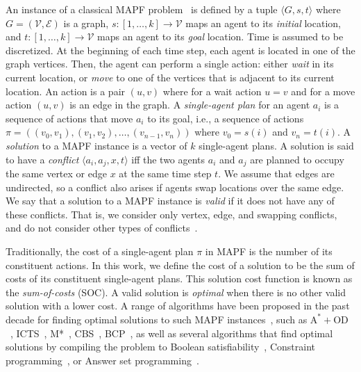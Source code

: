 \documentclass[jair,twoside,11pt,theapa]{article}
\newcommand{\tuple}[1]{\langle#1\rangle}
\newcommand{\vertices}{\mathcal{V}}
\newcommand{\edges}{\mathcal{E}}
\newcommand{\sourcetargets}{\mathcal{S}}
\newcommand{\oda}{$\mathrm{A^{*}+OD}$\xspace}
\begin{document}
An instance of a classical MAPF problem~ is defined by a tuple $\tuple{G, s, t}$ where $G=(\vertices,\edges)$ is a graph, $s:[1,\ldots,k]\rightarrow \vertices$ maps an agent to its \emph{initial} location, 
and $t:[1,\ldots,k]\rightarrow \vertices$ maps an agent to its \emph{goal} location. 
Time is assumed to be discretized. At the beginning of each time step, each agent is located in one of the graph vertices. 
Then, the agent can perform a single action: either \emph{wait} in its current location, or \emph{move} to one of the vertices that is adjacent to its current location. 
An action is a pair $(u,v)$ where for a wait action $u=v$ and for a move action $(u,v)$ is an edge in the graph. 
A \emph{single-agent plan} for an agent $a_i$ is a sequence of actions that move $a_i$ to its goal, i.e., a sequence of actions $\pi=((v_0,v_1),(v_1,v_2),\ldots,(v_{n-1},v_n))$ where $v_0=s(i)$ and $v_n=t(i)$. 
A \emph{solution} to a MAPF instance is a vector of $k$ single-agent plans.
A solution is said to have a \emph{conflict} $\tuple{a_i,a_j,x,t}$ iff the
two agents $a_i$ and $a_j$ are planned to occupy the same vertex or edge $x$ at the same time step $t$. We assume that edges are undirected, so a conflict also arises if agents swap locations over the same edge. 
We say that a solution to a MAPF instance is \emph{valid} if it does not have any of these conflicts. 
That is, we consider only vertex, edge, and swapping conflicts, and do not consider other types of conflicts~. 

Traditionally, the cost of a single-agent plan $\pi$ in MAPF is the number of its constituent actions.
In this work, we define the cost of a solution to be the sum of costs of its constituent single-agent plans.
This solution cost function is known as the \emph{sum-of-costs} (SOC). 
A valid solution is \emph{optimal} when there is no other valid solution with a lower cost. 
A range of algorithms have been proposed in the past decade for finding optimal solutions to such MAPF instances~, such as \oda~,
ICTS~,
M*~, 
CBS~, 
BCP~, 
as well as several algorithms that find optimal solutions by compiling the problem to Boolean satisfiability~, Constraint programming~, or Answer set programming~. 
\end{document}
